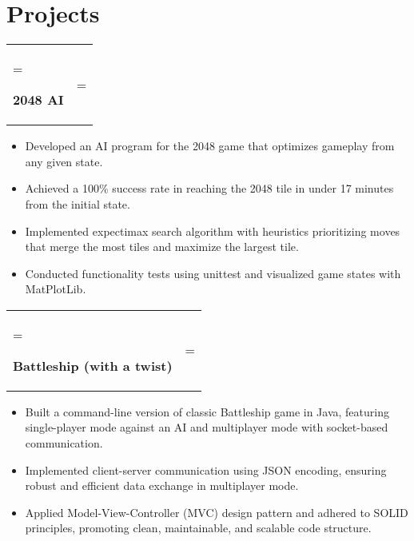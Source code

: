 \documentclass[letterpaper,11pt]{article}
\begin{document}
\section*{Projects}
\begin{tabularx}{\textwidth}{ 
  >{\hsize=0.7\textwidth\linewidth=\textwidth\raggedright\arraybackslash}X 
  >{\hsize=0.3\textwidth\linewidth=\textwidth\raggedleft\arraybackslash}X}
  \hspace*{0.03mm} 
  {\textbf{2048 AI}} \\
\end{tabularx}
\vspace{-5mm}
\begin{itemize}[leftmargin=20pt, rightmargin=0cm]
    \item Developed an AI program for the 2048 game that optimizes gameplay from any given state.
    \item Achieved a 100\% success rate in reaching the 2048 tile in under 17 minutes from the initial state.
    \item Implemented expectimax search algorithm with heuristics prioritizing moves that merge the most tiles and maximize the largest tile.
    \item Conducted functionality tests using unittest and visualized game states with MatPlotLib.
\end{itemize}
\begin{tabularx}{\textwidth}{ 
  >{\hsize=0.7\textwidth\linewidth=\textwidth\raggedright\arraybackslash}X 
  >{\hsize=0.3\textwidth\linewidth=\textwidth\raggedleft\arraybackslash}X}
  \hspace*{0.03mm} 
  {\textbf{Battleship (with a twist)}}\\
\end{tabularx}
\vspace{-5mm}
\begin{itemize}[leftmargin=20pt, rightmargin=0cm]
    \item Built a command-line version of classic Battleship game in Java, featuring single-player mode against an AI and multiplayer mode with socket-based communication.
    \item Implemented client-server communication using JSON encoding, ensuring robust and efficient data exchange in multiplayer mode.
    \item Applied Model-View-Controller (MVC) design pattern and adhered to SOLID principles, promoting clean, maintainable, and scalable code structure.
\end{itemize}
\end{document}
